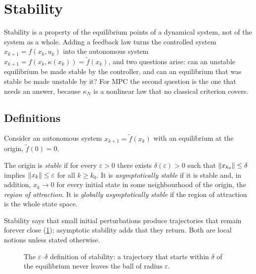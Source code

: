 \section{Stability}
\label{sec:stability}

Stability is a property of the equilibrium points of a dynamical system, not of the system as a
whole. Adding a feedback law turns the controlled system $x_{k+1} = f(x_k, u_k)$ into the
autonomous system $x_{k+1} = f(x_k, \kappa(x_k)) = \tilde f(x_k)$, and two questions arise: can
an unstable equilibrium be made stable by the controller, and can an equilibrium that was
stable be made unstable by it? For MPC the second question is the one that needs an answer,
because $\kappa_N$ is a nonlinear law that no classical criterion covers.

\subsection{Definitions}

Consider an autonomous system $x_{k+1} = \tilde f(x_k)$ with an equilibrium at the origin,
$\tilde f(0) = 0$.

\begin{definition}[stability]
The origin is \emph{stable} if for every $\varepsilon > 0$ there exists $\delta(\varepsilon) > 0$
such that $\left\lVert x_{k_0} \right\rVert \le \delta$ implies $\left\lVert x_k \right\rVert \le \varepsilon$ for all $k \ge k_0$.
It is \emph{asymptotically stable} if it is stable and, in addition, $x_k \to 0$ for every
initial state in some neighbourhood of the origin, the \emph{region of attraction}. It is
\emph{globally asymptotically stable} if the region of attraction is the whole state space.
\end{definition}

Stability says that small initial perturbations produce trajectories that remain forever close
(\cref{fig:epsdelta}); asymptotic stability adds that they return. Both are local notions
unless stated otherwise.

\begin{figure}[t]
\centering
{}
\caption{The $\varepsilon$--$\delta$ definition of stability: a trajectory that starts within
$\delta$ of the equilibrium never leaves the ball of radius $\varepsilon$.}
\label{fig:epsdelta}
\end{figure}

